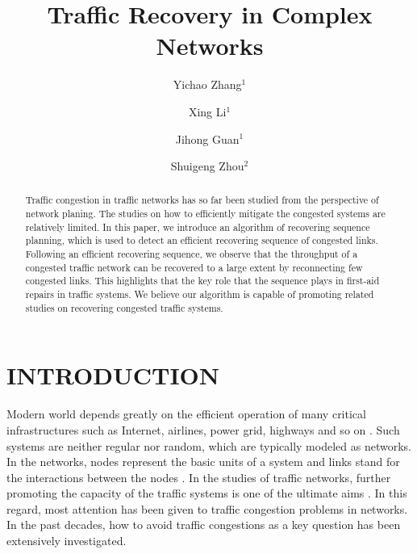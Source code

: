 \documentclass[onecolumn,preprintnumbers,amsmath,amssymb]{revtex4}
\begin{document}
\title{Traffic Recovery in Complex Networks}

\author{Yichao Zhang$^{1}$}

\author{Xing Li$^{1}$}


\author{Jihong Guan$^{1}$}


\author{Shuigeng Zhou$^{2}$}



\begin{abstract}
Traffic congestion in traffic networks has so far been studied from the perspective of network planing.
The studies on how to efficiently mitigate the congested systems are relatively limited.
In this paper, we introduce an algorithm of recovering sequence planning, which is used to detect an efficient recovering sequence of congested links.
Following an efficient recovering sequence, we observe that the throughput of a congested traffic network can be recovered to a large extent by reconnecting few congested links. This highlights that the key role that the sequence plays in first-aid repairs in traffic systems.
We believe our algorithm is capable of promoting related studies on recovering congested traffic systems.
\end{abstract}


\maketitle

\section*{INTRODUCTION\protect}
Modern world depends greatly on the efficient operation of many critical infrastructures such as Internet, airlines, power grid, highways and so on \cite{TCIC}.
Such systems are neither regular nor random, which are typically modeled as networks. In the networks, nodes represent the basic units of a system and links stand for the interactions between the nodes \cite{TFWN}. 
In the studies of traffic networks, further promoting the capacity of the traffic systems is one of the ultimate aims \cite{SBVV,ZTKE,ZTBE,RGA,GQZ,LZY,DDL,GYT,XLM,FTY,BDY,XLMD}. 
In this regard, most attention has been given to  traffic congestion problems in networks.
In the past decades, how to avoid  traffic congestions as  a key question has been extensively investigated.
\end{document}
